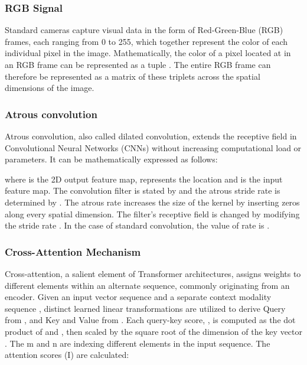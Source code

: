 \documentclass[lettersize,journal]{IEEEtran}
\begin{document}
\subsubsection{\textbf{RGB Signal}}

Standard cameras capture visual data in the form of Red-Green-Blue (RGB) frames, each ranging from 0 to 255, which together represent the color of each individual pixel in the image. Mathematically, the color of a pixel located at  in an RGB frame can be represented as a tuple . The entire RGB frame can therefore be represented as a matrix of these triplets across the spatial dimensions of the image.




\subsubsection{\textbf{Atrous convolution}}
Atrous convolution, also called dilated convolution, extends the receptive field in Convolutional Neural Networks (CNNs) without increasing computational load or parameters. It can be mathematically expressed as follows:




where  is the 2D output feature map,  represents the location and  is the input feature map. The convolution filter is stated by  and the atrous stride rate is determined by . The atrous rate  increases the size of the kernel by inserting  zeros along every spatial dimension. The filter’s receptive field is changed by modifying the stride rate \cite{Jun2022ACAU-Net:Segmentation}. In the case of standard convolution, the value of rate is . 





\subsubsection{\textbf{Cross-Attention Mechanism}}

Cross-attention, a salient element of Transformer architectures, assigns weights to different elements within an alternate sequence, commonly originating from an encoder. Given an input vector sequence  and a separate context modality sequence , distinct learned linear transformations are utilized to derive Query  from , and Key  and Value  from . Each query-key score, , is computed as the dot product of  and , then scaled by the square root of the dimension of the key vector . The m and n are indexing different elements in the input sequence. The attention scores (I) are calculated:
\end{document}
